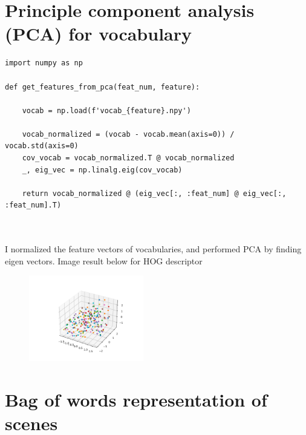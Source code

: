 \section*{Principle component analysis (PCA) for vocabulary}
\begin{lstlisting}
import numpy as np

def get_features_from_pca(feat_num, feature):

    vocab = np.load(f'vocab_{feature}.npy')

    vocab_normalized = (vocab - vocab.mean(axis=0)) / vocab.std(axis=0)
    cov_vocab = vocab_normalized.T @ vocab_normalized
    _, eig_vec = np.linalg.eig(cov_vocab)

    return vocab_normalized @ (eig_vec[:, :feat_num] @ eig_vec[:, :feat_num].T)



\end{lstlisting}

I normalized the feature vectors of vocabularies, and performed PCA by finding eigen vectors. Image result below for HOG descriptor

\begin{figure}[h]
	\includegraphics[width=5cm]{0.png}
\end{figure}

\section*{Bag of words representation of scenes}

